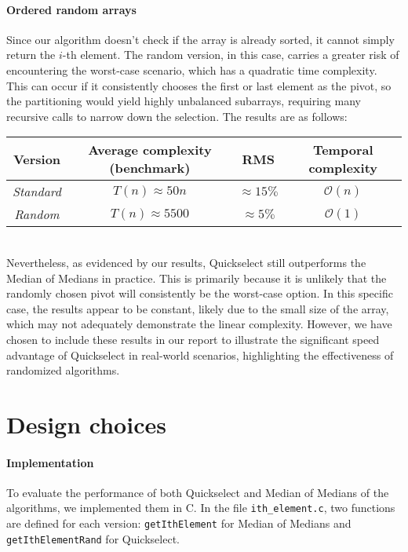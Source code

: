 \documentclass[paper=a4, fontsize=12pt]{scrartcl}
\numberwithin{equation}{section}
\numberwithin{figure}{section}
\numberwithin{table}{section}
\begin{document}
    \paragraph{Ordered random arrays}
    Since our algorithm doesn't check if the array is already sorted, it cannot simply return the $i$-th element.
    The random version, in this case, carries a greater risk of encountering the worst-case scenario, which has a quadratic time complexity. 
    This can occur if it consistently chooses the first or last element as the pivot, so the partitioning would yield highly unbalanced subarrays, requiring many recursive calls to narrow down the selection.
    The results are as follows:
    \begin{table}[!ht]
        \centering
        \begin{tabular}{|c|c|c|c|}
        \hline
        \textbf{Version}  & \textbf{Average complexity (benchmark)} & \textbf{RMS} & \textbf{Temporal complexity}      \\ \hline
        \textit{Standard} & $T(n) \approx 50n$     &         $\approx 15\%$                     & $\mathcal{O}(n)$             \\
        \textit{Random}   & $T(n) \approx 5500$    &          $\approx 5\%$                    & $\mathcal{O}(1)$             \\ \hline
        \end{tabular}
    \end{table} \\
    Nevertheless, as evidenced by our results, Quickselect still outperforms the Median of Medians in practice. 
    This is primarily because it is unlikely that the randomly chosen pivot will consistently be the worst-case option.
    In this specific case, the results appear to be constant, likely due to the small size of the array, which may not adequately demonstrate the linear complexity. 
    However, we have chosen to include these results in our report to illustrate the significant speed advantage of Quickselect in real-world scenarios, highlighting the effectiveness of randomized algorithms.

    \section{Design choices}
    \paragraph{Implementation}
    To evaluate the performance of both Quickselect and Median of Medians of the algorithms, we implemented them in C.
    In the file \texttt{ith\_element.c}, two functions are defined for each version: \texttt{getIthElement} for Median of Medians and \texttt{getIthElementRand} for Quickselect. 
\end{document}
